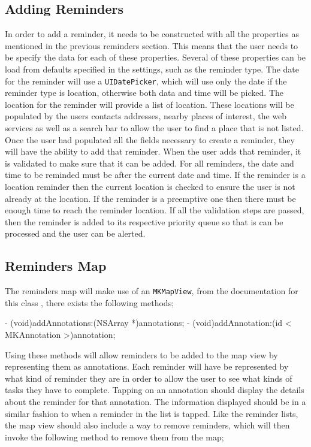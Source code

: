 \documentclass[12pt]{report}
\begin{document}
\subsection{Adding Reminders}

In order to add a reminder, it needs to be constructed with all the properties as mentioned in the previous reminders section. This means that the user needs to be specify the data for each of these properties. Several of these properties can be load from defaults specified in the settings, such as the reminder type. The date for the reminder will use a \texttt{UIDatePicker}, which will use only the date if the reminder type is location, otherwise both data and time will be picked. The location for the reminder will provide a list of location. These locations will be populated by the users contacts addresses, nearby places of interest, the web services as well as a search bar to allow the user to find a place that is not listed.\\

Once the user had populated all the fields necessary to create a reminder, they will have the ability to add that reminder. When the user adds that reminder, it is validated to make sure that it can be added. For all reminders, the date and time to be reminded must be after the current date and time. If the reminder is a location reminder then the current location is checked to ensure the user is not already at the location. If the reminder is a preemptive one then there must be enough time to reach the reminder location. If all the validation steps are passed, then the reminder is added to its respective priority queue so that is can be processed and the user can be alerted.

\subsection{Reminders Map}

The reminders map will make use of an \texttt{MKMapView}, from the documentation for this class \cite{mapview}, there exists the following methods;

\begin{objccode}
- (void)addAnnotations:(NSArray *)annotations;
- (void)addAnnotation:(id < MKAnnotation >)annotation;
\end{objccode}

Using these methods will allow reminders to be added to the map view by representing them as annotations. Each reminder will have be represented by what kind of reminder they are in order to allow the user to see what kinds of tasks they have to complete. Tapping on an annotation should display the details about the reminder for that annotation. The information displayed should be in a similar fashion to when a reminder in the list is tapped. Like the reminder lists, the map view should also include a way to remove reminders, which will then invoke the following method to remove them from the map;
\end{document}
